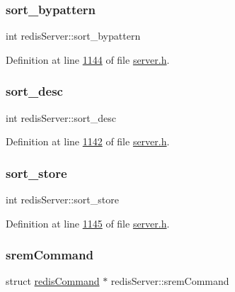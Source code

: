 \subsubsection{\texorpdfstring{sort\+\_\+bypattern}{sort\_bypattern}}
{\footnotesize\ttfamily int redis\+Server\+::sort\+\_\+bypattern}



Definition at line \hyperlink{server_8h_source_l01144}{1144} of file \hyperlink{server_8h_source}{server.\+h}.

\mbox{\label{structredisServer_a62c48c84feb7d446d1f283b9dfeabb71}} 
\subsubsection{\texorpdfstring{sort\+\_\+desc}{sort\_desc}}
{\footnotesize\ttfamily int redis\+Server\+::sort\+\_\+desc}



Definition at line \hyperlink{server_8h_source_l01142}{1142} of file \hyperlink{server_8h_source}{server.\+h}.

\mbox{\label{structredisServer_a8d6ddc24168f6707911773149ffd5063}} 
\subsubsection{\texorpdfstring{sort\+\_\+store}{sort\_store}}
{\footnotesize\ttfamily int redis\+Server\+::sort\+\_\+store}



Definition at line \hyperlink{server_8h_source_l01145}{1145} of file \hyperlink{server_8h_source}{server.\+h}.

\mbox{\label{structredisServer_a69db0ced6e187d4b6efaf56305406cb3}} 
\subsubsection{\texorpdfstring{srem\+Command}{sremCommand}}
{\footnotesize\ttfamily struct \hyperlink{structredisCommand}{redis\+Command} $\ast$ redis\+Server\+::srem\+Command}



